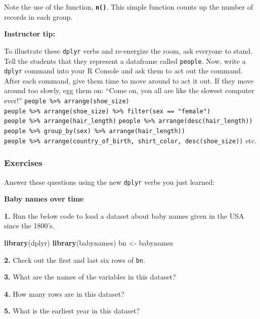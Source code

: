 \documentclass[
]{book}
\newenvironment{Shaded}{\begin{snugshade}}{\end{snugshade}}
\newcommand{\KeywordTok}[1]{\textcolor[rgb]{0.13,0.29,0.53}{\textbf{#1}}}
\newcommand{\NormalTok}[1]{#1}
\newcommand{\StringTok}[1]{\textcolor[rgb]{0.31,0.60,0.02}{#1}}
\begin{document}
Note the use of the function, \textbf{\texttt{n()}}. This simple function counts up the number of records in each group.

\leavevmode\hypertarget{tip-text}{}%
\textbf{Instructor tip:}

To illustrate these \texttt{dplyr} verbs and re-energize the room, ask everyone to stand. Tell the students that they represent a dataframe called \texttt{people}. Now, write a \texttt{dplyr} command into your R Console and ask them to act out the command. After each command, give them time to move around to act it out. If they move around too slowly, egg them on: ``Come on, you all are like the slowest computer ever!'' \texttt{people\ \%\textgreater{}\%\ arrange(shoe\_size)} \texttt{people\ \%\textgreater{}\%\ arrange(shoe\_size)\ \%\textgreater{}\%\ filter(sex\ ==\ "female")} \texttt{people\ \%\textgreater{}\%\ arrange(hair\_length)} \texttt{people\ \%\textgreater{}\%\ arrange(desc(hair\_length))} \texttt{people\ \%\textgreater{}\%\ group\_by(sex)\ \%\textgreater{}\%\ arrange(hair\_length))} \texttt{people\ \%\textgreater{}\%\ arrange(country\_of\_birth,\ shirt\_color,\ desc(shoe\_size))} etc.

\hypertarget{exercises-9}{%
\subsubsection*{Exercises}\label{exercises-9}}

Answer these questions using the new \texttt{dplyr} verbs you just learned:

\textbf{Baby names over time}

\textbf{1.} Run the below code to load a dataset about baby names given in the USA since the 1800's.

\begin{Shaded}
\begin{Highlighting}[]
\KeywordTok{library}\NormalTok{(dplyr)}
\KeywordTok{library}\NormalTok{(babynames)}
\NormalTok{bn <-}\StringTok{ }\NormalTok{babynames}
\end{Highlighting}
\end{Shaded}

\textbf{2.} Check out the first and last six rows of \texttt{bn}.

\textbf{3.} What are the names of the variables in this dataset?

\textbf{4.} How many rows are in this dataset?

\textbf{5.} What is the earliest year in this dataset?
\end{document}
